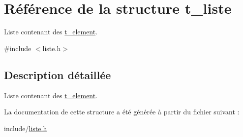 \hypertarget{structt__liste}{}\section{Référence de la structure t\+\_\+liste}
\label{structt__liste}


Liste contenant des \hyperlink{structt__element}{t\+\_\+element}.  




{\ttfamily \#include $<$liste.\+h$>$}



\subsection{Description détaillée}
Liste contenant des \hyperlink{structt__element}{t\+\_\+element}. 

La documentation de cette structure a été générée à partir du fichier suivant \+:\begin{DoxyCompactItemize}
\item 
include/\hyperlink{liste_8h}{liste.\+h}\end{DoxyCompactItemize}
